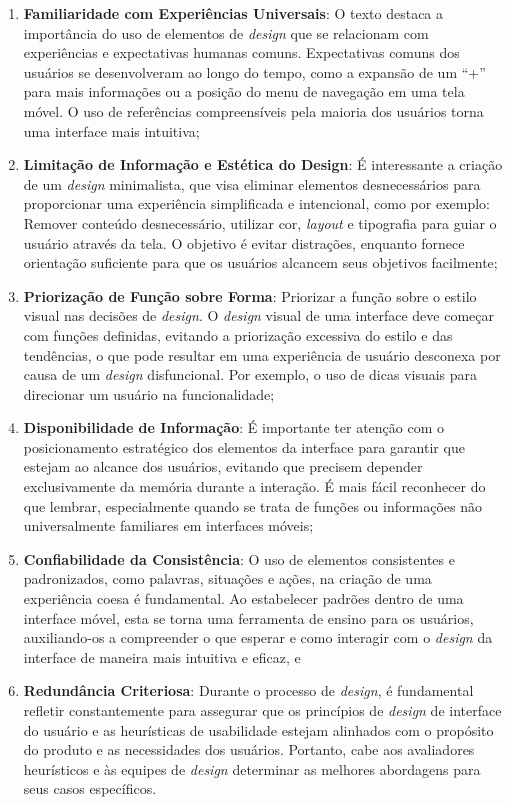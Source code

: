 \begin{enumerate}
    \item \textbf{Familiaridade com Experiências Universais}: O texto destaca a importância do uso de elementos de \textit{design} que se relacionam com experiências e expectativas humanas comuns. Expectativas comuns dos usuários se desenvolveram ao longo do tempo, como a expansão de um ``+'' para mais informações ou a posição do menu de navegação em uma tela móvel. O uso de referências compreensíveis pela maioria dos usuários torna uma interface mais intuitiva;
    \item \textbf{Limitação de Informação e Estética do Design}: É interessante a criação de um \textit{design} minimalista, que visa eliminar elementos desnecessários para proporcionar uma experiência simplificada e intencional, como por exemplo: Remover conteúdo desnecessário, utilizar cor, \textit{layout} e tipografia para guiar o usuário através da tela. O objetivo é evitar distrações, enquanto fornece orientação suficiente para que os usuários alcancem seus objetivos facilmente;
    \item \textbf{Priorização de Função sobre Forma}: Priorizar a função sobre o estilo visual nas decisões de \textit{design}. O \textit{design} visual de uma interface deve começar com funções definidas, evitando a priorização excessiva do estilo e das tendências, o que pode resultar em uma experiência de usuário desconexa por causa de um \textit{design} disfuncional. Por exemplo, o uso de dicas visuais para direcionar um usuário na funcionalidade;
    \item \textbf{Disponibilidade de Informação}: É importante ter atenção com o posicionamento estratégico dos elementos da interface para garantir que estejam ao alcance dos usuários, evitando que precisem depender exclusivamente da memória durante a interação. É mais fácil reconhecer do que lembrar, especialmente quando se trata de funções ou informações não universalmente familiares em interfaces móveis;
    \item \textbf{Confiabilidade da Consistência}: O uso de elementos consistentes e padronizados, como palavras, situações e ações, na criação de uma experiência coesa é fundamental. Ao estabelecer padrões dentro de uma interface móvel, esta se torna uma ferramenta de ensino para os usuários, auxiliando-os a compreender o que esperar e como interagir com o \textit{design} da interface de maneira mais intuitiva e eficaz, e
    \item \textbf{Redundância Criteriosa}: Durante o processo de \textit{design}, é fundamental refletir constantemente para assegurar que os princípios de \textit{design} de interface do usuário e as heurísticas de usabilidade estejam alinhados com o propósito do produto e as necessidades dos usuários. Portanto, cabe aos avaliadores heurísticos e às equipes de \textit{design} determinar as melhores abordagens para seus casos específicos.
\end{enumerate}



